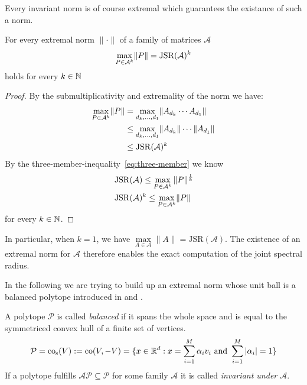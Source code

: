 Every invariant norm is of course extremal which guarantees the existance of such a norm. 
  
\begin{theorem}
    For every extremal norm $\lVert \cdot \rVert$ of a family of matrices $\mathcal{A}$ 
    $$
    \max \limits_{P \in \mathcal{A}^k} \lVert P \rVert = \operatorname{JSR}(\mathcal{A})^k
    $$
    holds for every $k \in \mathbb{N}$ 
\end{theorem}
\begin{proof}
    By the submultiplicativity and extremality of the norm we have:
    $$
    \begin{aligned}
        \max \limits_{P \in \mathcal{A}^k} \lVert P \rVert & = \max \limits_{d_k,\dots,d_1} \lVert A_{d_k}\cdots A_{d_1} \rVert \\
        & \le \max \limits_{d_k,\dots,d_1} \lVert A_{d_k} \rVert \cdots \lVert A_{d_1} \rVert \\
        & \le \operatorname{JSR}(\mathcal{A})^k 
    \end{aligned}
    $$
    By the three-member-inequality~\eqref{eq:three-member} we know
    $$
    \begin{aligned}
        & \operatorname{JSR}(\mathcal{A}) \leq \max_{P \in \mathcal{A}^k} \| P\|^{\frac{1}{k}} \\
        & \operatorname{JSR}(\mathcal{A})^k \leq \max \limits_{P \in \mathcal{A}^k} \lVert P \rVert 
    \end{aligned}
    $$
    for every $k \in \mathbb{N}$.

\end{proof}

\begin{remark}
    In particular, when $k = 1$, we have $\max\limits_{A \in \mathcal{A}} \lVert A \rVert = \mathrm{JSR}(\mathcal{A})$. The existence of an extremal norm for $\mathcal{A}$ therefore enables the exact computation of the joint spectral radius.
\end{remark}

In the following we are trying to build up an extremal norm whose unit ball is a balanced polytope introduced in \citep{protasov1996joint} and \citep{guglielmi2008algorithm}.

\begin{definition}
    A polytope $\mathcal{P}$ is called \emph{balanced} if it spans the whole space and is equal to the symmetriced convex hull of a finite set of vertices.
    $$\mathcal{P} = \text{co}_{\text{s}}(V) := \text{co}(V, -V) = \{x \in \mathbb{R}^d : x = \sum_{i=1}^M \alpha_i v_i \text{ and } \sum_{i=1}^M |\alpha_i| = 1\}$$
    If a polytope fulfills $\mathcal{A}\mathcal{P} \subseteq \mathcal{P}$ for some family $\mathcal{A}$ it is called \emph{invariant under $\mathcal{A}$}.
\end{definition}


